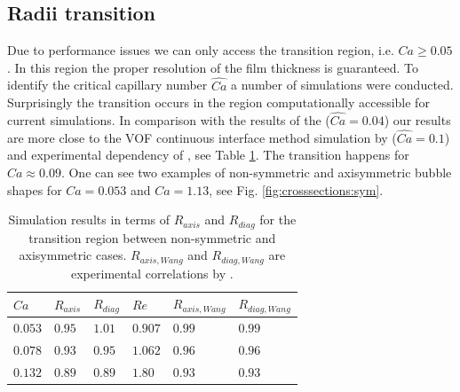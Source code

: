 \documentclass{article}
\begin{document}
\subsection{Radii transition}
Due to performance issues we can only access the
transition region, i.e. $Ca\geq 0.05$. In this region the proper resolution of the film thickness
is guaranteed. To identify the critical capillary number $\widehat{Ca}$ a number of simulations
were conducted. Surprisingly the transition occurs in the region computationally accessible for
current simulations. In comparison with the results of the \citet{heil-threedim}
($\widehat{Ca}=0.04$) our
results are more close to the VOF continuous interface method simulation by
\citet{wang-non-circular} ($\widehat{Ca}=0.1$) and experimental dependency of
\citet{shikazono-square}, see Table
\ref{table:transition:results}. The transition happens for $Ca\approx 0.09$.  One can see
two examples of non-symmetric and axisymmetric bubble shapes for $Ca=0.053$ and $Ca=1.13$, see Fig.
\ref{fig:crosssections:sym}.  
\begin{table}
\begin{tabularx}{\textwidth}{|X|X|X|X|X|X|}
\hline
$Ca$&$R_{axis}$&$R_{diag}$&$Re$&$R_{axis,Wang}$&$R_{diag,Wang}$\\
\hline
$0.053$&$0.95$&$1.01$&$0.907$&$0.99$&$0.99$\\
$0.078$&$0.93$&$0.95$&$1.062$&$0.96$&$0.96$\\
$0.132$&$0.89$&$0.89$&$1.80$&$0.93$&$0.93$\\
\hline
\end{tabularx}
\caption{Simulation results in terms of $R_{axis}$ and $R_{diag}$ for the transition region between
non-symmetric and axisymmetric cases. $R_{axis,Wang}$ and $R_{diag,Wang}$ are experimental
correlations by \citet{wang-non-circular}. \label{table:transition:results}}
\end{table}
\end{document}
